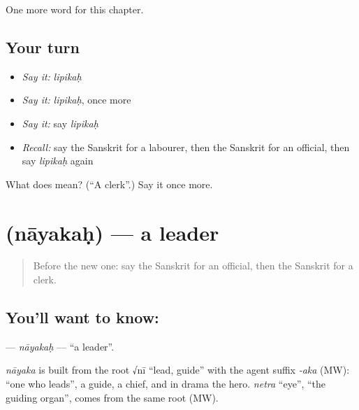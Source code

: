 \begin{grammarlens}[title={What you've built}]
One more word for this chapter.
\end{grammarlens}

\subsection*{Your turn}
\begin{itemize}
\raggedright
  \item \emph{Say it:} \emph{lipikaḥ}
  \item \emph{Say it:} \emph{lipikaḥ}, once more
  \item \emph{Say it:} say \emph{lipikaḥ}
  \item \emph{Recall:} say the Sanskrit for a labourer, then the Sanskrit for an official, then say \emph{lipikaḥ} again
\end{itemize}

\begin{tcolorbox}[breakable,colback=teal!4,colframe=teal!35!black,title={Before you move on}]
What does  mean? (\textquotedblleft{}A clerk\textquotedblright{}.) Say it once more.
\end{tcolorbox}
\section[\texorpdfstring{\sk{नायकः} (nāyakaḥ)}{नायकः (nāyakaḥ)}]{ (nāyakaḥ) — a leader}

\label{lesson:SA-C149-nayakah}



\begin{quote}
Before the new one: say the Sanskrit for an official, then the Sanskrit for a clerk.
\end{quote}

\subsection*{You'll want to know: }
\textbf{} — \emph{nāyakaḥ} — \textquotedblleft{}a leader\textquotedblright{}.

\begin{cousinweb}
\emph{nāyaka} is built from the root √nī \textquotedblleft{}lead, guide\textquotedblright{} with the agent suffix \emph{-aka} (MW): \textquotedblleft{}one who leads\textquotedblright{}, a guide, a chief, and in drama the hero. \emph{netra} \textquotedblleft{}eye\textquotedblright{}, \textquotedblleft{}the guiding organ\textquotedblright{}, comes from the same root (MW).
\end{cousinweb}

